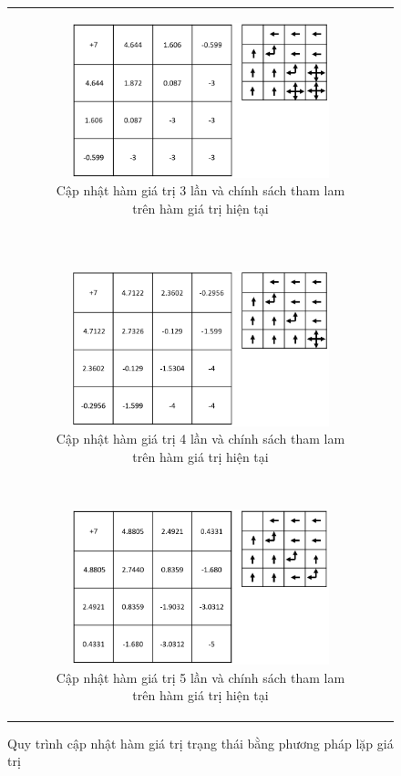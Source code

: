 \begin{figure}[t!]
\begin{tabular}{c}
\begin{subfigure}[t]{0.5\textwidth}
			\centering
			\includegraphics[height=45mm]{step_4}
			\caption{Cập nhật hàm giá trị 3 lần và chính sách tham lam trên hàm giá trị hiện tại}
		\end{subfigure} \\~\\
		\begin{subfigure}[t]{0.5\textwidth}
			\centering
			\includegraphics[height=45mm]{step_5}
			\caption{Cập nhật hàm giá trị 4 lần và chính sách tham lam trên hàm giá trị hiện tại}
		\end{subfigure}%
		~ 
		\begin{subfigure}[t]{0.5\textwidth}
			\centering
			\includegraphics[height=45mm]{step_6}
			\caption{Cập nhật hàm giá trị 5 lần và chính sách tham lam trên hàm giá trị hiện tại}
		\end{subfigure}
	\end{tabular}
	\caption[Minh họa quy trình lặp giá trị]{Quy trình cập nhật hàm giá trị trạng thái bằng phương pháp lặp giá trị}
	\label{fig:VI_process}
\end{figure}

